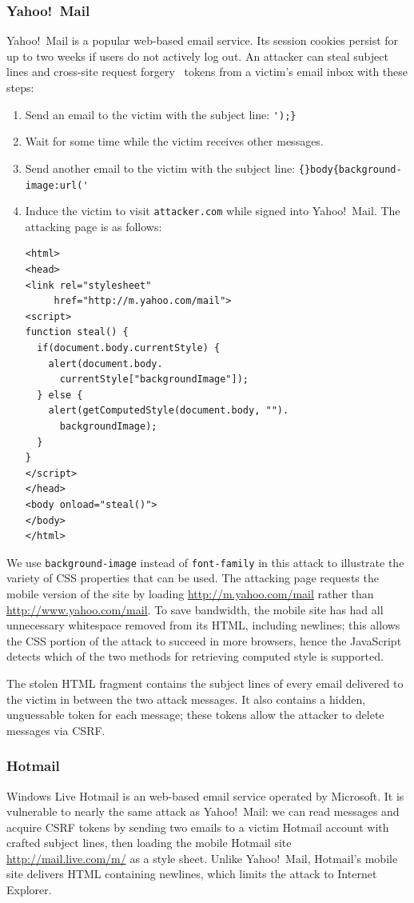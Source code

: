 \documentclass{sig-alternate}
\begin{document}
\subsubsection{Yahoo!\ Mail}
Yahoo!\ Mail is a popular web-based email service.  Its session cookies
persist for up to two weeks if users do not actively log out.  An
attacker can steal subject lines and cross-site request forgery~\cite{csrf}
tokens from a victim's email inbox with these steps:

\begin{enumerate}
\item Send an email to the victim with the subject line:
  \verb|');}|
\item Wait for some time while the victim receives other messages.
\item Send another email to the victim with the subject line:
  \verb|{}body{background-image:url('|
\item Induce the victim to visit \texttt{attacker.com} while signed
  into Yahoo!\ Mail.  The attacking page is as follows:
\begin{verbatim}
<html>
<head>
<link rel="stylesheet"
     href="http://m.yahoo.com/mail">
<script>
function steal() {
  if(document.body.currentStyle) {
    alert(document.body.
      currentStyle["backgroundImage"]);
  } else {
    alert(getComputedStyle(document.body, "").
      backgroundImage);
  }
}
</script>
</head>
<body onload="steal()">
</body>
</html>
\end{verbatim}
\end{enumerate}

We use \texttt{background-image} instead of \texttt{font-family} in
this attack to illustrate the variety of CSS properties that can be
used.  The attacking page requests the mobile version of the site by
loading \url{http://m.yahoo.com/mail} rather than
\url{http://www.yahoo.com/mail}.  To save bandwidth, the mobile site
has had all unnecessary whitespace removed from its HTML, including
newlines; this allows the CSS portion of the attack to succeed in more
browsers, hence the JavaScript detects which of the two methods for
retrieving computed style is supported.

The stolen HTML fragment contains the subject lines of every email
delivered to the victim in between the two attack messages.  It also
contains a hidden, unguessable token for each message; these tokens
allow the attacker to delete messages via CSRF.

\subsubsection{Hotmail}
Windows Live Hotmail is an web-based email service operated by
Microsoft. It is vulnerable to nearly the same attack as Yahoo!\  Mail:
we can read messages and acquire CSRF tokens by sending two emails to
a victim Hotmail account with crafted subject lines, then loading the
mobile Hotmail site \url{http://mail.live.com/m/} as a style
sheet. Unlike Yahoo!\ Mail, Hotmail's mobile site delivers HTML
containing newlines, which limits the attack to Internet Explorer.
\end{document}
